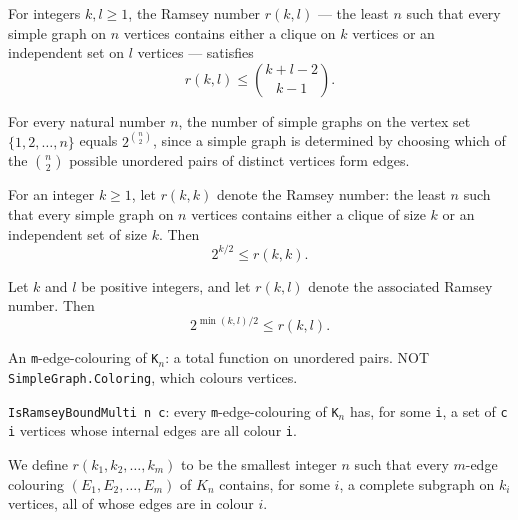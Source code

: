 \begin{theorem}
\label{SimpleGraph.ramseyNumber_le_choose}
For integers $k, l \ge 1$, the Ramsey number $r(k, l)$ — the least $n$ such that every
simple graph on $n$ vertices contains either a clique on $k$ vertices or an independent
set on $l$ vertices — satisfies
\[
r(k, l) \le \binom{k + l - 2}{k - 1}.
\]
\end{theorem}

\begin{theorem}
\label{SimpleGraph.card_simpleGraph_fin}
For every natural number $n$, the number of simple graphs on the vertex set $\{1, 2,
\ldots, n\}$ equals $2^{\binom{n}{2}}$, since a simple graph is determined by choosing
which of the $\binom{n}{2}$ possible unordered pairs of distinct vertices form edges.
\end{theorem}

\begin{theorem}
\label{SimpleGraph.ramsey_self_lower_bound}
For an integer $k \ge 1$, let $r(k,k)$ denote the Ramsey number: the least $n$ such that
every simple graph on $n$ vertices contains either a clique of size $k$ or an
independent set of size $k$. Then
\[
2^{k/2} \le r(k,k).
\]
\end{theorem}

\begin{theorem}
\label{SimpleGraph.ramseyNumber_ge_of_min}
Let $k$ and $l$ be positive integers, and let $r(k,l)$ denote the associated Ramsey
number. Then
\[
2^{\min(k,l)/2} \le r(k,l).
\]
\end{theorem}

\begin{definition}
\label{SimpleGraph.EdgeColouring}
\leanok
An \texttt{m}-edge-colouring of \texttt{K$_{n}$}: a total function on unordered pairs.
NOT \texttt{SimpleGraph.Coloring}, which colours vertices.
\end{definition}

\begin{definition}
\label{SimpleGraph.IsRamseyBoundMulti}
\leanok
{}
\texttt{IsRamseyBoundMulti n c}: every \texttt{m}-edge-colouring of \texttt{K$_{n}$} has, for some \texttt{i}, a set of \texttt{c i}
vertices whose internal edges are all colour \texttt{i}.

We define $r(k_1, k_2, \ldots, k_m)$ to be the smallest integer $n$ such that
every $m$-edge colouring $(E_1, E_2, \ldots, E_m)$ of $K_n$ contains, for some
$i$, a complete subgraph on $k_i$ vertices, all of whose edges are in colour
$i$.
\end{definition}

